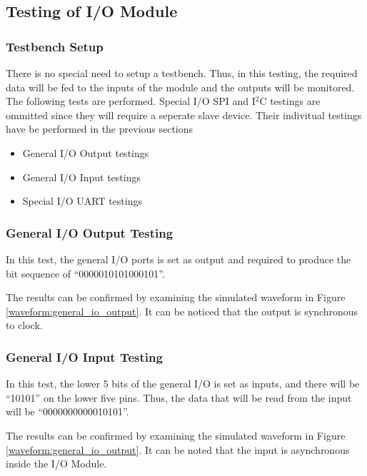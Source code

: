 \subsection{Testing of I/O Module}
\subsubsection{Testbench Setup}
There is no special need to setup a testbench.
Thus, in this testing, the required data will be fed to the inputs of the module and the outputs will be monitored.
The following tests are performed. Special I/O SPI and I$^2$C testings are ommitted since they will require a seperate slave device.
Their indivitual testings have be performed in the previous sections
\begin{itemize}
    \item General I/O Output testings
    \item General I/O Input testings
    \item Special I/O UART testings
\end{itemize}

\newpage
\subsubsection{General I/O Output Testing}
In this test, the general I/O ports is set as output and required to produce the bit sequence of ``0000010101000101''.


The results can be confirmed by examining the simulated waveform in Figure \ref{waveform:general_io_output}.
It can be noticed that the output is synchronous to clock.

\subsubsection{General I/O Input Testing}
In this test, the lower 5 bits of the general I/O is set as inputs, and there will be ``10101'' on the lower five pins.
Thus, the data that will be read from the input will be ``0000000000010101''.

The results can be confirmed by examining the simulated waveform in Figure \ref{waveform:general_io_output}.
It can be noted that the input is asynchronous inside the I/O Module.

